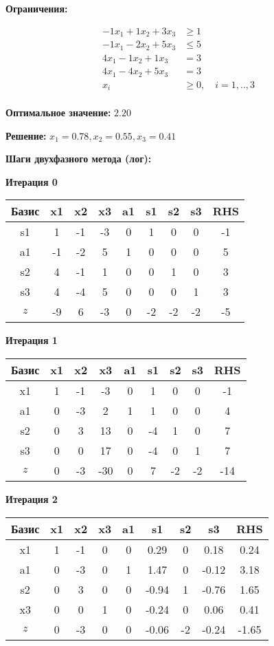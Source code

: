 \documentclass[a4paper,12pt]{article}
\begin{document}
\textbf{Ограничения:}

\[ \begin{aligned}
-1x_{1} +1x_{2} +3x_{3} &\ge 1 \\
-1x_{1} -2x_{2} +5x_{3} &\le 5 \\
4x_{1} -1x_{2} +1x_{3} &= 3 \\
4x_{1} -4x_{2} +5x_{3} &= 3 \\
x_i &\ge 0,\quad i=1,..,3\\
\end{aligned}\]

\textbf{Оптимальное значение: }$2.20$

\textbf{Решение: }$x_{1}=0.78, x_{2}=0.55, x_{3}=0.41$

\textbf{Шаги двухфазного метода (лог):}


 \textbf{Итерация 0}\\
\begin{tabular}{|c|c|c|c|c|c|c|c|c|}
\hline
Базис & x1 & x2 & x3 & a1 & s1 & s2 & s3 & RHS \\ \hline
s1 & 1 & -1 & -3 & 0 & 1 & 0 & 0 & -1 \\ \hline
a1 & -1 & -2 & 5 & 1 & 0 & 0 & 0 & 5 \\ \hline
s2 & 4 & -1 & 1 & 0 & 0 & 1 & 0 & 3 \\ \hline
s3 & 4 & -4 & 5 & 0 & 0 & 0 & 1 & 3 \\ \hline
$z$ & -9 & 6 & -3 & 0 & -2 & -2 & -2 & -5 \\ \hline
\end{tabular}
\vspace{5mm}

 \textbf{Итерация 1}\\
\begin{tabular}{|c|c|c|c|c|c|c|c|c|}
\hline
Базис & x1 & x2 & x3 & a1 & s1 & s2 & s3 & RHS \\ \hline
x1 & 1 & -1 & -3 & 0 & 1 & 0 & 0 & -1 \\ \hline
a1 & 0 & -3 & 2 & 1 & 1 & 0 & 0 & 4 \\ \hline
s2 & 0 & 3 & 13 & 0 & -4 & 1 & 0 & 7 \\ \hline
s3 & 0 & 0 & 17 & 0 & -4 & 0 & 1 & 7 \\ \hline
$z$ & 0 & -3 & -30 & 0 & 7 & -2 & -2 & -14 \\ \hline
\end{tabular}
\vspace{5mm}

 \textbf{Итерация 2}\\
\begin{tabular}{|c|c|c|c|c|c|c|c|c|}
\hline
Базис & x1 & x2 & x3 & a1 & s1 & s2 & s3 & RHS \\ \hline
x1 & 1 & -1 & 0 & 0 & 0.29 & 0 & 0.18 & 0.24 \\ \hline
a1 & 0 & -3 & 0 & 1 & 1.47 & 0 & -0.12 & 3.18 \\ \hline
s2 & 0 & 3 & 0 & 0 & -0.94 & 1 & -0.76 & 1.65 \\ \hline
x3 & 0 & 0 & 1 & 0 & -0.24 & 0 & 0.06 & 0.41 \\ \hline
$z$ & 0 & -3 & 0 & 0 & -0.06 & -2 & -0.24 & -1.65 \\ \hline
\end{tabular}
\vspace{5mm}
\end{document}
